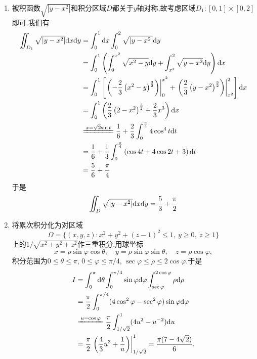 \documentclass{ctexart}
\begin{document}
\begin{solution}
    \begin{enumerate}[label=\tbf{(\arabic*)}]
        \item 被积函数$\sqrt{\left|y-x^2\right|}$和积分区域$D$都关于$y$轴对称,故考虑区域$D_1:[0,1]\times[0,2]$即可.我们有
            \[\begin{aligned}
                \iint_{D_1}\sqrt{\left|y-x^2\right|}\dx\di y
                &= \int_0^1\dx\int_0^2\sqrt{\left|y-x^2\right|}\di y \\
                &= \int_0^1\left(\int_0^{x^2}\sqrt{x^2-y}\di y+\int_{x^2}^2\sqrt{y-x^2}\di y\right)\di x \\
                &= \int_0^1\left[\left.\left(-\dfrac23\left(x^2-y\right)^{\frac32}\right)\right|_0^{x^2}+\left.\left(\dfrac23\left(y-x^2\right)^{\frac32}\right)\right|_{x^2}^2\right]\di x \\
                &= \int_0^1\left(\dfrac23\left(2-x^2\right)^{\frac32}+\dfrac23x^3\right)\dx \\
                &\xlongequal{x=\sqrt2{\sin t}}\dfrac16+\dfrac23\int_0^{\frac\pi4}4\cos^4t\di t \\
                &= \dfrac16+\dfrac13\int_0^{\frac\pi4}\left(\cos4t+4\cos2t+3\right)\di t \\
                &= \dfrac56+\dfrac\pi4
            \end{aligned}\]
            于是
            \[\iint_D\sqrt{\left|y-x^2\right|}\mathrm{d} x\mathrm{d} y=\dfrac53+\dfrac\pi2\]

        \item 将累次积分化为对区域
            \[\Omega=\{(x,y,z):x^2+y^2+(z-1)^2\leqslant1,\ y\geqslant0,\ z\geqslant1\}\]
            上的$1/\sqrt{x^2+y^2+z^2}$作三重积分.用球坐标
            \[x=\rho\sin\varphi\cos\theta,\quad y=\rho\sin\varphi\sin\theta,\quad z=\rho\cos\varphi,\]
            积分范围为$0\leqslant\theta\leqslant\pi$, $0\leqslant\varphi\leqslant\pi/4$, $\sec\varphi\leqslant\rho\leqslant2\cos\varphi$.于是
            \[\begin{aligned}
                I&=\int_0^\pi\di\theta\int_0^{\pi/4}\sin\varphi\di\varphi\int_{\sec\varphi}^{2\cos\varphi}\rho\di\rho\\
                &=\dfrac\pi2\int_0^{\pi/4}(4\cos^2\varphi-\sec^2\varphi)\sin\varphi\di\varphi\\
                &\xlongequal{u=\cos\varphi}\dfrac\pi2\int_{1/\sqrt2}^1(4u^2-u^{-2})\di u\\
                &=\dfrac\pi2\left.\left(\dfrac43u^3+\dfrac1u\right)\right|_{1/\sqrt2}^1
                =\dfrac{\pi(7-4\sqrt2)}6.
            \end{aligned}\]

    \end{enumerate}

\end{solution}
\end{document}

